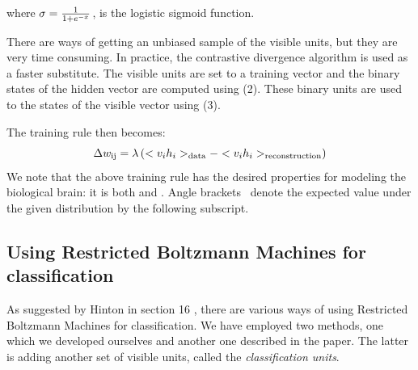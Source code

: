 where $\sigma = \frac{1}{1  + e^{- x}}^{}$, is the logistic sigmoid
function.

There are ways of getting an unbiased sample of the visible units, but they
are very time consuming. In practice, the contrastive divergence algorithm is
used as a faster substitute. The visible units are set to a training vector
and the binary states of the hidden vector are computed using (2). These
binary units are used to  the states of the visible
vector using (3).

The training rule then becomes:
\[ \Delta w_{\operatorname{ij}} = \lambda \left( < v_i h_i >_{\operatorname{data}} - < v_i h_i
   >_{\operatorname{reconstruction}} \right) \]
We note that the above training rule has the desired properties for modeling
the biological brain: it is both  and .
Angle brackets \ denote the expected value under the given distribution by the
following subscript.



\subsection{Using Restricted Boltzmann Machines for classification}

As suggested by Hinton in section 16 \cite{hinton2010practical}, there are various ways of using Restricted
Boltzmann Machines for classification. We have employed two methods, one which
we developed ourselves and another one described in the paper. The latter is adding
another set of visible units, called the \emph{classification units}.



